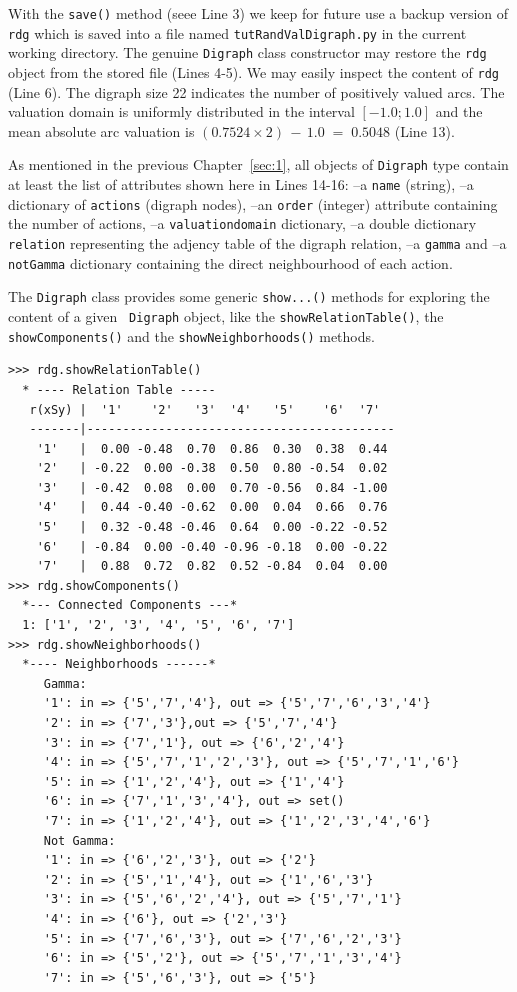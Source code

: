 With the \texttt{save()}  method (seee Line 3) we keep for future use a backup version of \texttt{rdg} which is saved into a file named \texttt{tutRandValDigraph.py} in the current working directory. The genuine \texttt{Digraph} class constructor may restore the \texttt{rdg} object from the stored file (Lines 4-5). We may easily inspect the content of \texttt{rdg} (Line 6). The digraph size 22 indicates the number of positively valued arcs. The valuation domain is uniformly distributed in the interval $[-1.0; 1.0]$ and the mean absolute arc valuation is $(0.7524 \times 2)\, -\, 1.0 \;=\; 0.5048$ (Line 13).

As mentioned in the previous Chapter~\ref{sec:1}, all objects of \texttt{Digraph} type contain at least the list of attributes shown here in Lines 14-16: --a \texttt{name} (string), --a dictionary of \texttt{actions} (digraph nodes), --an \texttt{order} (integer) attribute containing the number of actions, --a \texttt{valuationdomain} dictionary, --a double dictionary \texttt{relation} representing the adjency table of the digraph relation, --a \texttt{gamma} and --a {\tt notGamma} dictionary containing the direct neighbourhood of each action.

The \texttt{Digraph} class provides some generic \texttt{show...()} methods for exploring the content of a given \texttt{ Digraph} object, like the \texttt{showRelationTable()}, the \texttt{showComponents()} and the \texttt{showNeighborhoods()} methods.
\begin{lstlisting}[caption={Example of random valuation digraph},label=list:2.2]
>>> rdg.showRelationTable()
  * ---- Relation Table -----
   r(xSy) |  '1'    '2'   '3'  '4'   '5'    '6'  '7'	  
   -------|-------------------------------------------
    '1'   |  0.00 -0.48  0.70  0.86  0.30  0.38  0.44	 
    '2'   | -0.22  0.00 -0.38  0.50  0.80 -0.54  0.02	 
    '3'   | -0.42  0.08  0.00  0.70 -0.56  0.84 -1.00	 
    '4'   |  0.44 -0.40 -0.62  0.00  0.04  0.66  0.76	 
    '5'   |  0.32 -0.48 -0.46  0.64  0.00 -0.22 -0.52	 
    '6'   | -0.84  0.00 -0.40 -0.96 -0.18  0.00 -0.22	 
    '7'   |  0.88  0.72  0.82  0.52 -0.84  0.04  0.00
>>> rdg.showComponents()
  *--- Connected Components ---*
  1: ['1', '2', '3', '4', '5', '6', '7']
>>> rdg.showNeighborhoods()
  *---- Neighborhoods ------*
     Gamma:
     '1': in => {'5','7','4'}, out => {'5','7','6','3','4'}
     '2': in => {'7','3'},out => {'5','7','4'}
     '3': in => {'7','1'}, out => {'6','2','4'}
     '4': in => {'5','7','1','2','3'}, out => {'5','7','1','6'}
     '5': in => {'1','2','4'}, out => {'1','4'}
     '6': in => {'7','1','3','4'}, out => set()
     '7': in => {'1','2','4'}, out => {'1','2','3','4','6'}
     Not Gamma:
     '1': in => {'6','2','3'}, out => {'2'}
     '2': in => {'5','1','4'}, out => {'1','6','3'}
     '3': in => {'5','6','2','4'}, out => {'5','7','1'}
     '4': in => {'6'}, out => {'2','3'}
     '5': in => {'7','6','3'}, out => {'7','6','2','3'}
     '6': in => {'5','2'}, out => {'5','7','1','3','4'}
     '7': in => {'5','6','3'}, out => {'5'}
\end{lstlisting}   

